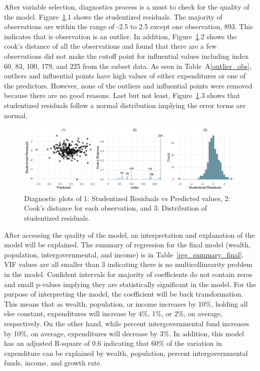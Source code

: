 \documentclass[11pt]{article}\usepackage[]{graphicx}\usepackage[]{color}
\makeatletter
\def\maxwidth{ %
  \ifdim\Gin@nat@width>\linewidth
    \linewidth
  \else
    \Gin@nat@width
  \fi
}
\makeatother
\begin{document}
\noindent After variable selection, diagnostics process is a must to check for the quality of the model. Figure~\ref{diag-plot1}.1 shows the studentized residuals. The majority of observations are within the range of -2.5 to 2.5 except one observation, 893. This indicates that is observation is an outlier. In addition, Figure~\ref{diag-plot1}.2 shows the cook's distance of all the observations and found that there are a few observations did not make the cutoff point for influential values including index 60, 83, 100, 179, and 225 from the subset data. As seen in Table~A\ref{outlier_obs}, outliers and influential points have high values of either expenditures or one of the predictors. However, none of the outliers and influential points were removed because there are no good reasons. Last but not least, Figure~\ref{diag-plot1}.3 shows that studentized residuals follow a normal distribution implying the error terms are normal.    
\hfill \break

\begin{figure}[h!] 
\begin{center}

\includegraphics[width=\maxwidth]{figure/unnamed-chunk-5-1} 

\caption{Diagnostic plots of 1: Studentized Residuals vs Predicted values, 2: Cook's distance for each observation, and 3: Distribution of studentized residuals.}
\label{diag-plot1}
\end{center} 
\end{figure}

\noindent After accessing the quality of the model, an interpretation and explanation of the model will be explained. The summary of regression for the final model (wealth, population, intergovernmental, and income) is in Table~\ref{reg_summary_final}. VIF values are all smaller than 3 indicating there is no multicollinearity problem in the model. Confident intervals for majority of coefficients do not contain zeros and small p-values implying they are statistically significant in the model. For the purpose of interpreting the model, the coefficient will be back transformation. This means that as wealth, population, or income increases by 10\%, holding all else constant, expenditures will increase by 4\%, 1\%, or 2\%, on average, respectively. On the other hand, while percent intergovernmental fund increases by 10\%, on average, expenditures will decrease by 3\%. In addition, this model has an adjusted R-square of 0.6 indicating that 60\% of the variation in expenditure can be explained by wealth, population, percent intergovernmental funds, income, and growth rate.   
\end{document}
